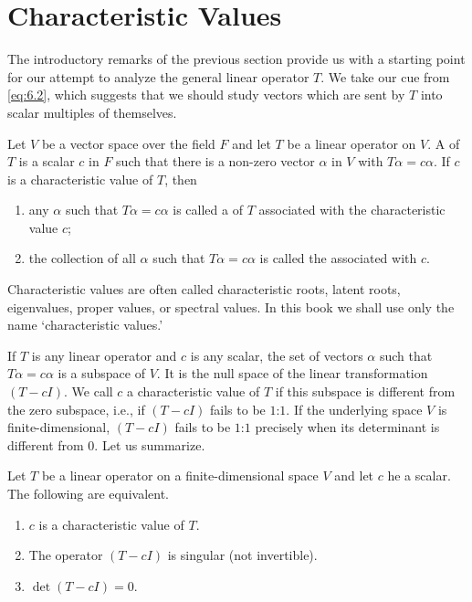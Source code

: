 \section{Characteristic Values}

The introductory remarks of the previous section provide us with a starting point for our attempt to analyze the general linear operator \(T\). We take our cue from \eqref{eq:6.2}, which suggests that we should study vectors which are sent by \(T\) into scalar multiples of themselves.

\begin{definition}
    Let \(V\) be a vector space over the field \(F\) and let \(T\) be a linear operator on \(V\). A  of \(T\) is a scalar \(c\) in \(F\) such that there is a non-zero vector \(\alpha\) in \(V\) with \(T\alpha=c\alpha\). If \(c\) is a characteristic value of \(T\), then
    \begin{enumerate}
        \item any \(\alpha\) such that \(T\alpha=c\alpha\) is called a  of \(T\) associated with the characteristic value \(c\);
        \item the collection of all \(\alpha\) such that \(T\alpha=c\alpha\) is called the  associated with \(c\).
    \end{enumerate}
\end{definition}

Characteristic values are often called characteristic roots, latent roots, eigenvalues, proper values, or spectral values. In this book we shall use only the name `characteristic values.'

If \(T\) is any linear operator and \(c\) is any scalar, the set of vectors \(\alpha\) such that \(T\alpha=c\alpha\) is a subspace of \(V\). It is the null space of the linear transformation \(\left(T-cI\right)\). We call \(c\) a characteristic value of \(T\) if this subspace is different from the zero subspace, i.e., if \(\left(T-cI\right)\) fails to be \(1\):\(1\). If the underlying space \(V\) is finite-dimensional, \(\left(T-cI\right)\) fails to be \(1\):\(1\) precisely when its determinant is different from \(0\). Let us summarize.

\begin{theorem}
    Let \(T\) be a linear operator on a finite-dimensional space \(V\) and let \(c\) he a scalar. The following are equivalent.
    \begin{enumerate}
        \item \(c\) is a characteristic value of \(T\).
        \item The operator \(\left(T-cI\right)\) is singular (not invertible).
        \item\label{itm:6.2.5} \(\det\left(T-cI\right)=0\).
    \end{enumerate}
\end{theorem}

